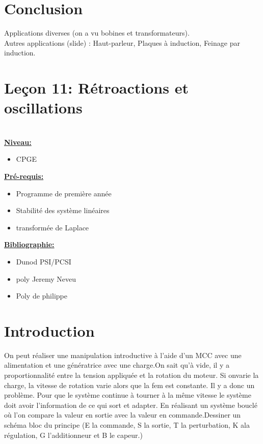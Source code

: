 \documentclass[french, a4paper, 10pt, twocolumn, landscape]{article}
\begin{document}
\section*{Conclusion} 
Applications diverses (on a vu bobines et transformateurs). \\
Autres applications (slide) : Haut-parleur, Plaques à induction, Feinage par induction.

\clearpage 

\section*{Leçon 11: Rétroactions et oscillations}

\hrulefill\\

\noindent\underline{\textbf{Niveau:}}
\begin{itemize}
  \item CPGE 
\end{itemize}
\underline{\textbf{Pr{\'e}-requis: }}

\begin{itemize}  
\item Programme de première année
\item Stabilité des système linéaires
\item transformée de Laplace
\end{itemize}
\underline{\textbf{Bibliographie:}}

\begin{itemize}
  \item Dunod PSI/PCSI
  \item poly Jeremy Neveu
  \item Poly de philippe
\end{itemize}
\hrulefill


\section*{Introduction}

On peut réaliser une manipulation introductive à l'aide d'un MCC avec une alimentation et une génératrice avec une charge.On sait qu'à vide, il y a proportionnalité entre la tension appliquée et la rotation du moteur. Si onvarie la charge, la vitesse de rotation varie alors que la fem est constante. Il y a donc un problème. Pour que le système continue à tourner à la même vitesse le système doit avoir l'information de ce qui sort et adapter. En réalisant un système bouclé où l'on compare la valeur en sortie avec la valeur en commande.Dessiner un schéma bloc du principe (E la commande, S la sortie, T la perturbation, K ala régulation, G l'additionneur et B le capeur.) \medskip
\end{document}
